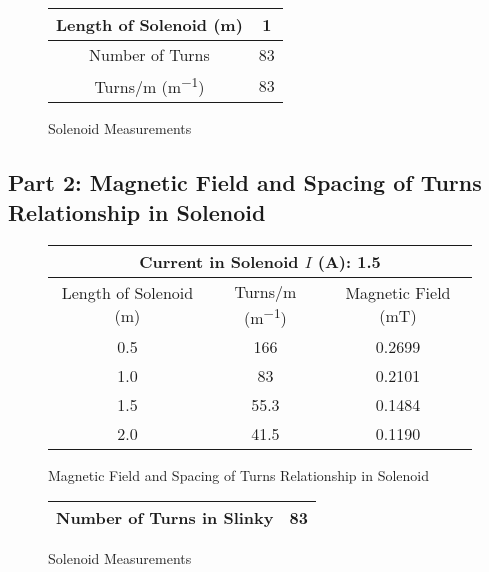 \documentclass[article, 12pt]{article}
\begin{document}
        \begin{figure}[H]
            \centering
            \begin{tabular}{|c|c|}
               \hline
               Length of Solenoid (\si{\meter}) & 1 \\ 
               \hline
               Number of Turns & 83 \\
               \hline
               Turns/\si{\meter} (\si{\meter^{-1}}) & 83 \\
               \hline
            \end{tabular}
            \caption{Solenoid Measurements}
            \label{fig:solenoid}
        \end{figure}
     \subsection{Part 2: Magnetic Field and Spacing of Turns Relationship in Solenoid}
     \begin{figure}[H]
         \centering
         \begin{tabular}{|c|c|c|}
            \hline
            \multicolumn{3}{|c|}{Current in Solenoid $I$ (\si{\ampere}): 1.5}\\
            \hline
            Length of Solenoid (\si{\meter}) & Turns/\si{\meter} (\si{\meter^{-1}}) & Magnetic Field (\si{\milli\tesla})\\
            \hline
            0.5 & 166 & 0.2699 \\
            1.0 & 83 & 0.2101 \\
            1.5 & 55.3 & 0.1484 \\
            2.0 & 41.5 & 0.1190 \\
            \hline
         \end{tabular}
         \caption{Magnetic Field and Spacing of Turns Relationship in Solenoid}
         \label{fig:spacing}
     \end{figure}

     \begin{figure}[H]
         \centering
         \begin{tabular}{|c|c|}
            \hline
            Number of Turns in Slinky & 83 \\
            \hline
         \end{tabular}
         \caption{Solenoid Measurements}
         \label{fig:slinky}
     \end{figure}
\end{document}
